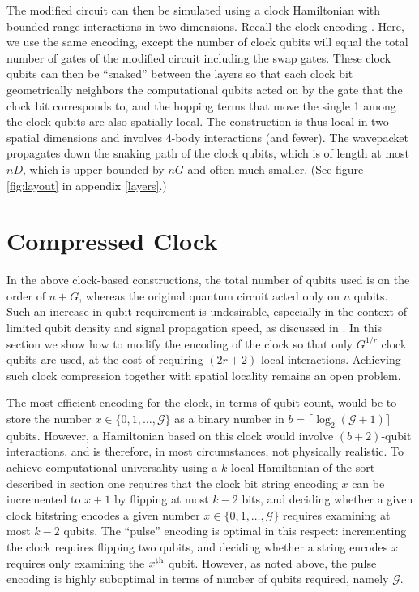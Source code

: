 \documentclass[11pt]{article}
\begin{document}
The modified circuit can then be simulated using a clock Hamiltonian with bounded-range interactions in two-dimensions. Recall the clock encoding . Here, we use the same encoding, except the number of clock qubits will equal the total number of gates of the modified circuit including the swap gates. These clock qubits can then be ``snaked'' between the layers so that each clock bit geometrically neighbors the computational qubits acted on by the gate that the clock bit corresponds to, and the hopping terms that move the single 1 among the clock qubits are also spatially local. The construction is thus local in two spatial dimensions and involves 4-body interactions (and fewer). The wavepacket propagates down the snaking path of the clock qubits, which is of length at most $nD$, which is upper bounded by $nG$ and often much smaller. (See figure \ref{fig:layout} in appendix \ref{layers}.)

\section{Compressed Clock}
\label{sec:compressed}

In the above clock-based constructions, the total number of qubits used is on the order of $n+G$, whereas the original quantum circuit acted only on $n$ qubits. Such an increase in qubit requirement is undesirable, especially in the context of limited  qubit density and signal propagation speed, as discussed in . In this section we show how to modify the encoding of the clock so that only $G^{1/r}$ clock qubits are used, at the cost of requiring $(2r+2)$-local interactions. Achieving such clock compression together with spatial locality remains an open problem.

The most efficient encoding for the clock, in terms of qubit count, would be to store the number $x \in \{0,1,\ldots,\mathcal{G}\}$ as a binary number in $b = \lceil \log_2 (\mathcal{G}+1) \rceil$ qubits. However, a Hamiltonian based on this clock would involve $(b+2)$-qubit interactions, and is therefore, in most circumstances, not physically realistic. To achieve computational universality using a $k$-local Hamiltonian of the sort described in section  one requires that the clock bit string encoding $x$ can be incremented to $x+1$ by flipping at most $k-2$ bits, and deciding whether a given clock bitstring encodes a given number $x \in \{0,1,\ldots,\mathcal{G}\}$ requires examining at most $k-2$ qubits. The ``pulse'' encoding  is optimal in this respect: incrementing the clock requires flipping two qubits, and deciding whether a string encodes $x$ requires only examining the $x^\mathrm{th}$ qubit. However, as noted above, the pulse encoding is highly suboptimal in terms of number of qubits required, namely $\mathcal{G}$.
\end{document}
